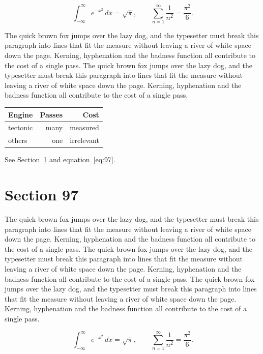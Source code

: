 \documentclass{article}
\begin{document}
\begin{equation}\label{eq:96}
\int_{-\infty}^{\infty} e^{-x^{2}}\,dx = \sqrt{\pi}, \qquad
\sum_{n=1}^{\infty} \frac{1}{n^{2}} = \frac{\pi^{2}}{6}.
\end{equation}

The quick brown fox jumps over the lazy dog, and the typesetter must break this paragraph into lines that fit the measure without leaving a river of white space down the page. Kerning, hyphenation and the badness function all contribute to the cost of a single pass. The quick brown fox jumps over the lazy dog, and the typesetter must break this paragraph into lines that fit the measure without leaving a river of white space down the page. Kerning, hyphenation and the badness function all contribute to the cost of a single pass. 

\begin{center}
\begin{tabular}{lrr}
\toprule
Engine & Passes & Cost \\
\midrule
tectonic & many & measured \\
others & one & irrelevant \\
\bottomrule
\end{tabular}
\end{center}

See Section~\ref{sec:97} and equation~\eqref{eq:97}.
\section{Section 97}
\label{sec:97}
The quick brown fox jumps over the lazy dog, and the typesetter must break this paragraph into lines that fit the measure without leaving a river of white space down the page. Kerning, hyphenation and the badness function all contribute to the cost of a single pass. The quick brown fox jumps over the lazy dog, and the typesetter must break this paragraph into lines that fit the measure without leaving a river of white space down the page. Kerning, hyphenation and the badness function all contribute to the cost of a single pass. The quick brown fox jumps over the lazy dog, and the typesetter must break this paragraph into lines that fit the measure without leaving a river of white space down the page. Kerning, hyphenation and the badness function all contribute to the cost of a single pass. 

\begin{equation}\label{eq:97}
\int_{-\infty}^{\infty} e^{-x^{2}}\,dx = \sqrt{\pi}, \qquad
\sum_{n=1}^{\infty} \frac{1}{n^{2}} = \frac{\pi^{2}}{6}.
\end{equation}
\end{document}
